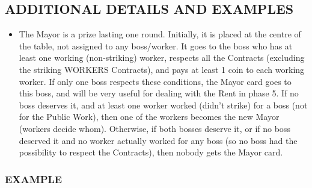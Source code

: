     \subsection{ADDITIONAL DETAILS AND EXAMPLES}

        \begin{itemize}
            \item The Mayor is a prize lasting one round. Initially, it is placed at the centre
            of the table, not assigned to any boss/worker. It goes to the boss who has
            at least one working (non-striking) worker, respects all the Contracts (excluding
            the striking WORKERS Contracts), and pays at least 1 coin to each
            working worker. If only one boss respects these conditions, the Mayor card
            goes to this boss, and will be very useful for dealing with the Rent in phase
            5. If no boss deserves it, and at least one worker worked (didn't strike) for
            a boss (not for the Public Work), then one of the workers becomes the new
            Mayor (workers decide whom). Otherwise, if both bosses deserve it, or if no
            boss deserved it and no worker actually worked for any boss (so no boss had
            the possibility to respect the Contracts), then nobody gets the Mayor card.
        \end{itemize}
    
        \subsubsection{EXAMPLE}

